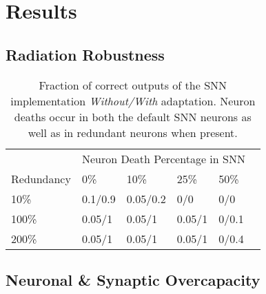 \section{Results}\label{sec:results}

\subsection{Radiation Robustness}\label{subsec:algorithm_performance}

\begin{table}[H]
\caption{Fraction of correct outputs of the SNN implementation \textit{Without/With} adaptation. Neuron deaths occur in both the default SNN neurons as well as in redundant neurons when present.}
\begin{tabular}{llllll}
        & \multicolumn{5}{l}{Neuron Death Percentage in SNN} \\ \cmidrule{2-6}
        Redundancy & 0\%    & 10\%    & 25\%    & 50\%     \\ \hline
        10\%       & 0.1/0.9    & 0.05/0.2     & 0/0       & 0/0       \\
        100\%      & 0.05/1      & 0.05/1       & 0.05/1       & 0/0.1            \\
        200\%      & 0.05/1      & 0.05/1       & 0.05/1       & 0/0.4    
\end{tabular}
\end{table}


\subsection{Neuronal \& Synaptic Overcapacity}\label{subsec:results_neuronal_synaptic_overcapacity}

